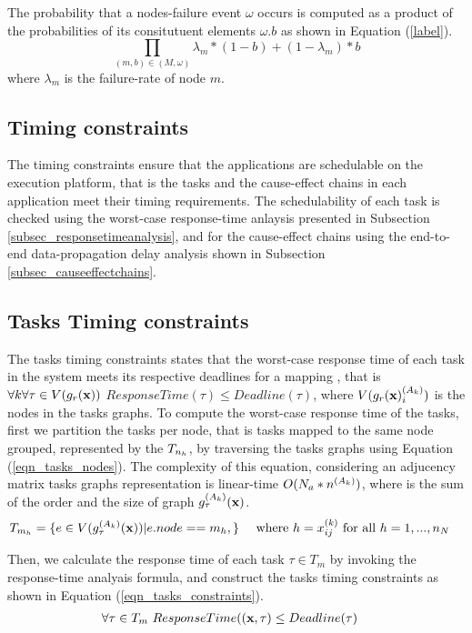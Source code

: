 The probability that a nodes-failure event $\omega$ occurs is computed as a product of the probabilities of its consitutuent elements $\omega.b$ as shown in Equation (\ref{label}).
\begin{equation}
\label{eqn_pro}
	\prod_{(m,b)\in (M,\omega)}{\lambda_m*(1-b)+(1-\lambda_m)*b}
\end{equation}
where $\lambda_m$ is the failure-rate of node $m$.

\subsection{Timing constraints}
The timing constraints ensure that the applications are schedulable on the execution platform, that is the tasks and the cause-effect chains in each application meet their timing requirements. The schedulability of each task is checked using the worst-case response-time anlaysis presented in Subsection \ref{subsec_responsetimeanalysis}, and for the cause-effect chains using the end-to-end data-propagation delay analysis shown in Subsection \ref{subsec_causeeffectchains}. 


\subsection{Tasks Timing constraints}
The tasks timing constraints states that the worst-case response time of each task in the system meets its respective deadlines for a mapping \ttx, that is $\forall k\forall \tau\in V(g_r(\textbf{x}))$ $ResponseTime(\tau)\leq Deadline(\tau)$, where $V(\sss{g_r(\x)})$ is the nodes in the tasks graphs. To compute the worst-case response time of the tasks, first we partition the tasks per node, that is tasks mapped to the same node grouped, represented by the $\ssb{T}[n_h]$, by traversing the tasks graphs using Equation (\ref{eqn_tasks_nodes}). The complexity of this equation, considering an adjucency matrix tasks graphs representation is linear-time $O(N_a*\ssp{n})$, where  is the sum of the order and the size of graph $\sss{g}[k][\tau](\x)$.
\begin{align}
\label{eqn_tasks_nodes}
T_{m_h}&=\{e\in V(\sss{g}[k][\tau](\x)) | e.node == m_h, \}& \mbox{ where }h=\xkij & \mbox{ for all } h=1,...,n_N
\end{align}

Then, we calculate the response time of each task $\tau \in T_{m}$ by invoking the response-time analyais formula, and construct the tasks timing constraints as shown in Equation (\ref{eqn_tasks_constraints}).
\begin{align}
\label{eqn_tasks_constraints}
\forall \tau\in T_{m} \ ResponseTime((\textbf{x},\tau)&\leq Deadline(\tau)
\end{align}

